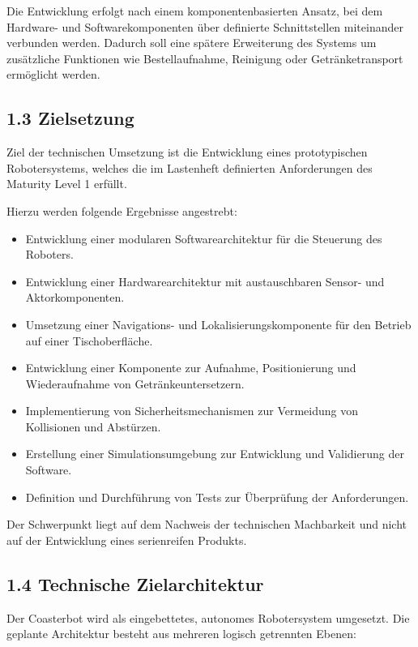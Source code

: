 \documentclass[
  a4paper,
  12pt,
  DIV=12,        %
  parskip=half,  %
  headings=small %
]{scrartcl}
\theoremstyle{definition}
\providecommand{\tightlist}{%
  \setlength{\itemsep}{0pt}\setlength{\parskip}{0pt}}
\theoremstyle{definition}
\providecommand{\tightlist}{%
  \setlength{\itemsep}{0pt}\setlength{\parskip}{0pt}}
\begin{document}
Die Entwicklung erfolgt nach einem komponentenbasierten Ansatz, bei dem
Hardware- und Softwarekomponenten über definierte Schnittstellen
miteinander verbunden werden. Dadurch soll eine spätere Erweiterung des
Systems um zusätzliche Funktionen wie Bestellaufnahme, Reinigung oder
Getränketransport ermöglicht werden.

\subsection{1.3 Zielsetzung}\label{zielsetzung}

Ziel der technischen Umsetzung ist die Entwicklung eines prototypischen
Robotersystems, welches die im Lastenheft definierten Anforderungen des
Maturity Level 1 erfüllt.

Hierzu werden folgende Ergebnisse angestrebt:

\begin{itemize}
\tightlist
\item
  Entwicklung einer modularen Softwarearchitektur für die Steuerung des
  Roboters.
\item
  Entwicklung einer Hardwarearchitektur mit austauschbaren Sensor- und
  Aktorkomponenten.
\item
  Umsetzung einer Navigations- und Lokalisierungskomponente für den
  Betrieb auf einer Tischoberfläche.
\item
  Entwicklung einer Komponente zur Aufnahme, Positionierung und
  Wiederaufnahme von Getränkeuntersetzern.
\item
  Implementierung von Sicherheitsmechanismen zur Vermeidung von
  Kollisionen und Abstürzen.
\item
  Erstellung einer Simulationsumgebung zur Entwicklung und Validierung
  der Software.
\item
  Definition und Durchführung von Tests zur Überprüfung der
  Anforderungen.
\end{itemize}

Der Schwerpunkt liegt auf dem Nachweis der technischen Machbarkeit und
nicht auf der Entwicklung eines serienreifen Produkts.

\subsection{1.4 Technische
Zielarchitektur}\label{technische-zielarchitektur}

Der Coasterbot wird als eingebettetes, autonomes Robotersystem
umgesetzt. Die geplante Architektur besteht aus mehreren logisch
getrennten Ebenen:
\end{document}
